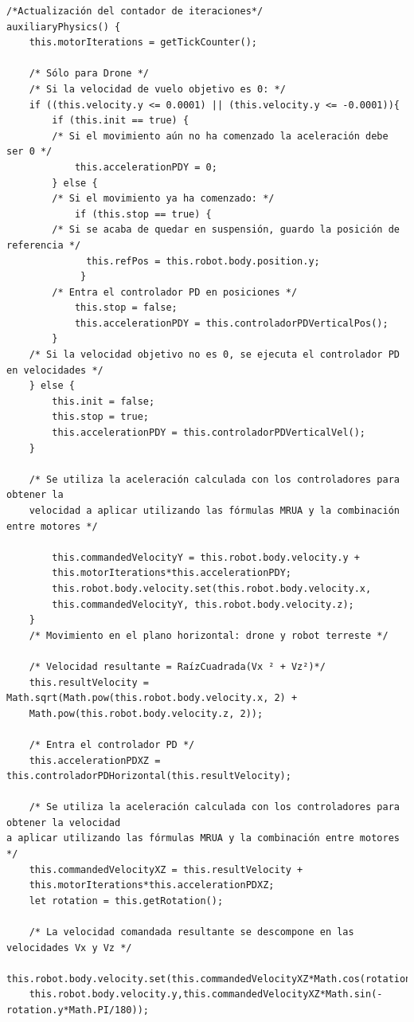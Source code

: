 \footnotesize {
\begin{verbatim}
/*Actualización del contador de iteraciones*/
auxiliaryPhysics() {
    this.motorIterations = getTickCounter(); 
               
    /* Sólo para Drone */
    /* Si la velocidad de vuelo objetivo es 0: */
    if ((this.velocity.y <= 0.0001) || (this.velocity.y <= -0.0001)){
        if (this.init == true) {
        /* Si el movimiento aún no ha comenzado la aceleración debe ser 0 */
            this.accelerationPDY = 0;
        } else { 
        /* Si el movimiento ya ha comenzado: */
    	    if (this.stop == true) {
    	/* Si se acaba de quedar en suspensión, guardo la posición de referencia */
    		  this.refPos = this.robot.body.position.y;
    		 }
    	/* Entra el controlador PD en posiciones */
            this.stop = false;
    		this.accelerationPDY = this.controladorPDVerticalPos();
    	}
    /* Si la velocidad objetivo no es 0, se ejecuta el controlador PD en velocidades */
    } else {
        this.init = false;
        this.stop = true;
        this.accelerationPDY = this.controladorPDVerticalVel();
    }
                
    /* Se utiliza la aceleración calculada con los controladores para obtener la 
    velocidad a aplicar utilizando las fórmulas MRUA y la combinación entre motores */
                
        this.commandedVelocityY = this.robot.body.velocity.y + 
        this.motorIterations*this.accelerationPDY;
        this.robot.body.velocity.set(this.robot.body.velocity.x, 
        this.commandedVelocityY, this.robot.body.velocity.z); 
    }
    /* Movimiento en el plano horizontal: drone y robot terreste */
    
    /* Velocidad resultante = RaízCuadrada(Vx ² + Vz²)*/
	this.resultVelocity = Math.sqrt(Math.pow(this.robot.body.velocity.x, 2) + 
	Math.pow(this.robot.body.velocity.z, 2));
	
	/* Entra el controlador PD */
	this.accelerationPDXZ = this.controladorPDHorizontal(this.resultVelocity); 
	
	/* Se utiliza la aceleración calculada con los controladores para obtener la velocidad 
a aplicar utilizando las fórmulas MRUA y la combinación entre motores */
	this.commandedVelocityXZ = this.resultVelocity + 
	this.motorIterations*this.accelerationPDXZ;
	let rotation = this.getRotation();
	
	/* La velocidad comandada resultante se descompone en las velocidades Vx y Vz */
	this.robot.body.velocity.set(this.commandedVelocityXZ*Math.cos(rotation.y*Math.PI/180), 
	this.robot.body.velocity.y,this.commandedVelocityXZ*Math.sin(-rotation.y*Math.PI/180));
	

\end{verbatim}}
